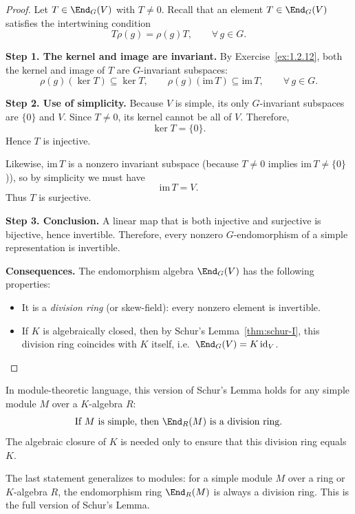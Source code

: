 \begin{proof}
Let $T\in\End_G(V)$ with $T\neq 0$.
Recall that an element $T\in\End_G(V)$ satisfies the intertwining condition
\[
T\rho(g) = \rho(g)T, \qquad \forall\, g\in G.
\]

\smallskip
\noindent\textbf{Step 1. The kernel and image are invariant.}
By Exercise~\ref{ex:1.2.12}, both the kernel and image of $T$ are $G$-invariant subspaces:
\[
\rho(g)(\ker T) \subseteq \ker T, 
\qquad
\rho(g)(\mathrm{im}\,T) \subseteq \mathrm{im}\,T,
\qquad \forall\, g\in G.
\]

\smallskip
\noindent\textbf{Step 2. Use of simplicity.}
Because $V$ is simple, its only $G$-invariant subspaces are $\{0\}$ and $V$.
Since $T\neq 0$, its kernel cannot be all of $V$.
Therefore,
\[
\ker T = \{0\}.
\]
Hence $T$ is injective.

Likewise, $\mathrm{im}\,T$ is a nonzero invariant subspace (because $T\neq 0$ implies $\mathrm{im}\,T\neq\{0\}$)),
so by simplicity we must have
\[
\mathrm{im}\,T = V.
\]
Thus $T$ is surjective.

\smallskip
\noindent\textbf{Step 3. Conclusion.}
A linear map that is both injective and surjective is bijective, hence invertible.
Therefore, every nonzero $G$-endomorphism of a simple representation is invertible.

\smallskip
\noindent\textbf{Consequences.}
The endomorphism algebra $\End_G(V)$ has the following properties:
\begin{itemize}
    \item It is a \emph{division ring} (or skew-field): every nonzero element is invertible.
    \item If $K$ is algebraically closed, then by Schur’s Lemma~\ref{thm:schur-I},
          this division ring coincides with $K$ itself, i.e.\ $\End_G(V)=K\,\mathrm{id}_V$.
\end{itemize}
\end{proof}

\begin{remark}
In module-theoretic language, this version of Schur’s Lemma holds for any simple module $M$
over a $K$-algebra $R$:
\[
\text{If $M$ is simple, then }\End_R(M)\text{ is a division ring.}
\]
The algebraic closure of $K$ is needed only to ensure that this division ring equals $K$.
\end{remark}


\begin{remark}
The last statement generalizes to modules:  
for a simple module $M$ over a ring or $K$-algebra $R$,
the endomorphism ring $\End_R(M)$ is always a division ring.
This is the full version of Schur’s Lemma.
\end{remark}

